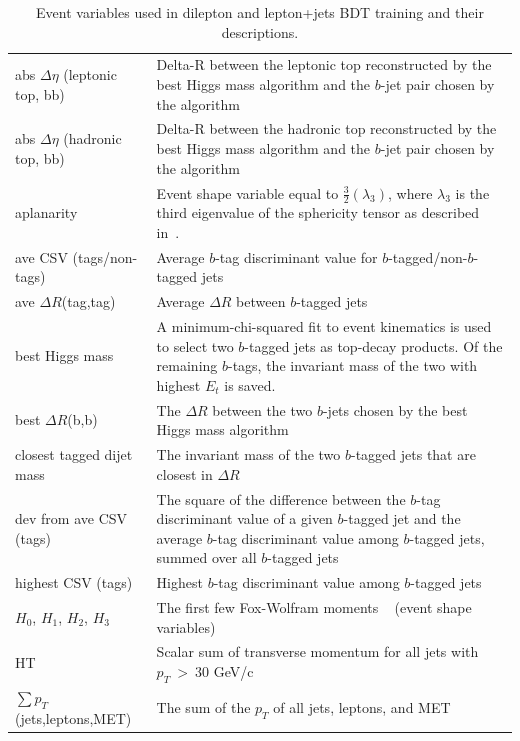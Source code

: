 \begin{table}[hbtp]\footnotesize
 \centering 
 \caption{Event variables used in dilepton and lepton+jets BDT training and their descriptions.}
 \label{tab:bdt_input_vars}
 \begin{tabular}{| l | p{10cm} |}
   \hline
   abs \(\Delta \eta\) (leptonic top, bb)      					&  Delta-R between the leptonic top reconstructed by the best Higgs mass algorithm and the $b$-jet pair chosen by the algorithm \\
   abs \(\Delta \eta\) (hadronic top, bb)						&  Delta-R between the hadronic top reconstructed by the best Higgs mass algorithm and the $b$-jet pair chosen by the algorithm \\
   aplanarity  									&  Event shape variable equal to \(\frac{3}{2}(\lambda_{3})\), where \(\lambda_{3}\) is the third eigenvalue of the sphericity tensor as described in~\cite{PhysRevD.1.1416}. \\
   ave CSV (tags/non-tags)    							&  Average $b$-tag discriminant value for $b$-tagged/non-$b$-tagged jets \\
   ave \(\Delta R\)(tag,tag)  							&  Average \(\Delta R\) between $b$-tagged jets \\
   best Higgs mass   								&  A minimum-chi-squared fit to event kinematics is used to select two $b$-tagged jets as top-decay products. Of the remaining $b$-tags, the invariant mass of the two with highest $E_{t}$ is saved. \\
   best \(\Delta R\)(b,b)								& The \(\Delta R\) between the two $b$-jets chosen by the best Higgs mass algorithm \\
   closest tagged dijet mass  							&  The invariant mass of the two $b$-tagged jets that are closest in \(\Delta R\)  \\
   dev from ave CSV (tags)  							&  The square of the difference between the $b$-tag discriminant value of a given $b$-tagged jet and the average $b$-tag discriminant value among $b$-tagged jets, summed over all $b$-tagged jets \\
   highest CSV (tags)  								&  Highest $b$-tag discriminant value among $b$-tagged jets \\
   $H_{0}$, $H_{1}$, $H_{2}$, $H_{3}$  						&  The first few Fox-Wolfram moments ~\cite{tagkey1979543} (event shape variables)  \\
   HT										& Scalar sum of transverse momentum for all jets with \(p_{T}~>~30\) GeV/c \\
\(\sum p_{T}\)(jets,leptons,MET)  						&  The sum of the \(p_{T}\) of all jets, leptons, and MET \\

\end{tabular}
\end{table}

